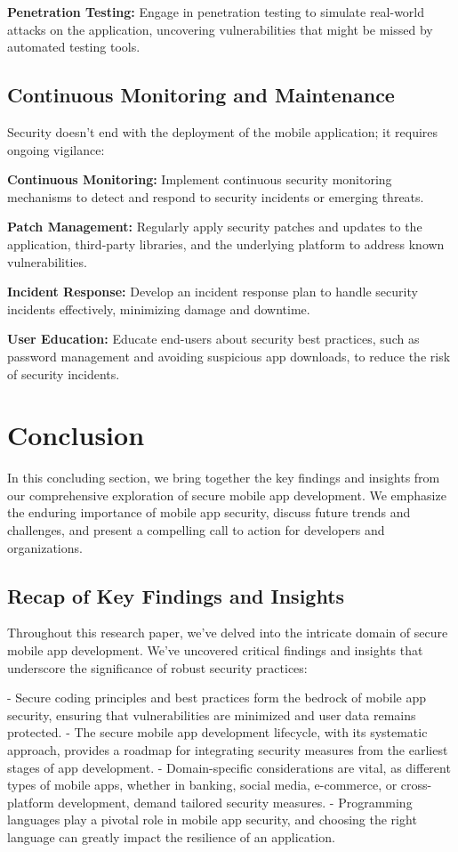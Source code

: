 \documentclass[conference]{IEEEtran}
\begin{document}
\textbf{Penetration Testing:} Engage in penetration testing to simulate real-world attacks on the application, uncovering vulnerabilities that might be missed by automated testing tools.

\subsection{Continuous Monitoring and Maintenance}

Security doesn't end with the deployment of the mobile application; it requires ongoing vigilance:

\textbf{Continuous Monitoring:} Implement continuous security monitoring mechanisms to detect and respond to security incidents or emerging threats.

\textbf{Patch Management:} Regularly apply security patches and updates to the application, third-party libraries, and the underlying platform to address known vulnerabilities.

\textbf{Incident Response:} Develop an incident response plan to handle security incidents effectively, minimizing damage and downtime.

\textbf{User Education:} Educate end-users about security best practices, such as password management and avoiding suspicious app downloads, to reduce the risk of security incidents.

\section{Conclusion}

In this concluding section, we bring together the key findings and insights from our comprehensive exploration of secure mobile app development. We emphasize the enduring importance of mobile app security, discuss future trends and challenges, and present a compelling call to action for developers and organizations.

\subsection{Recap of Key Findings and Insights}

Throughout this research paper, we've delved into the intricate domain of secure mobile app development. We've uncovered critical findings and insights that underscore the significance of robust security practices:

- Secure coding principles and best practices form the bedrock of mobile app security, ensuring that vulnerabilities are minimized and user data remains protected.
- The secure mobile app development lifecycle, with its systematic approach, provides a roadmap for integrating security measures from the earliest stages of app development.
- Domain-specific considerations are vital, as different types of mobile apps, whether in banking, social media, e-commerce, or cross-platform development, demand tailored security measures.
- Programming languages play a pivotal role in mobile app security, and choosing the right language can greatly impact the resilience of an application.
\end{document}
